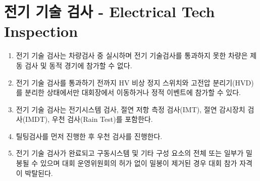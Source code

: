 \documentclass[final,a4paper,10pt]{report}
\begin{document}
\section{전기 기술 검사 - Electrical Tech Inspection}\label{rule:formula-technical.electrical-tech-inspection}
\begin{enumerate}
  \item\label{rule:formula-technical.electrical-tech-inspection.gates-brake-dynamic-events} 전기 기술 검사는 차량검사 중 실시하며 전기 기술검사를 통과하지 못한 차량은 제동 검사 및 동적 경기에 참가할 수 없다.
  \item\label{rule:formula-technical.electrical-tech-inspection.restricted-movement-hvd-disconnected} 전기 기술 검사를 통과하기 전까지 HV 비상 정지 스위치와 고전압 분리기(HVD)를 분리한 상태에서만 대회장에서 이동하거나 정적 이벤트에 참가할 수 있다.
  \item\label{rule:formula-technical.electrical-tech-inspection.component-inspections} 전기 기술 검사는 전기시스템 검사, 절연 저항 측정 검사(IMT), 절연 감시장치 검사(IMDT), 우천 검사(Rain Test)를 포함한다.
  \item\label{rule:formula-technical.electrical-tech-inspection.tilt-before-rain-test} 틸팅검사를 먼저 진행한 후 우천 검사를 진행한다.
  \item\label{rule:formula-technical.electrical-tech-inspection.seal-removal-disqualification} 전기 기술 검사가 완료되고 구동시스템 및 기타 구성 요소의 전체 또는 일부가 밀봉될 수 있으며 대회 운영위원회의 허가 없이 밀봉이 제거된 경우 대회 참가 자격이 박탈된다.
\end{enumerate}
\end{document}
